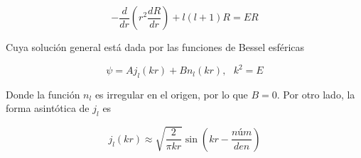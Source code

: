 \begin{equation}
-\frac{d}{dr} \left(r^2 \frac{d R}{dr} \right) +  l (l + 1) R = E R
\end{equation}

Cuya solución general está dada por las funciones de Bessel esféricas

\begin{equation*}
\psi=A j_l(k r) + B n_l(kr), ~~~ k^2=E
\end{equation*}

Donde la función $n_l$ es irregular en el origen, por lo que $B=0$. Por otro lado, la forma asintótica de $j_l$ es

\begin{equation*}
j_l(k r) \approx \sqrt{\frac{2}{\pi k r}} \sin \left(kr-\frac{núm}{den}\right)
\end{equation*}


